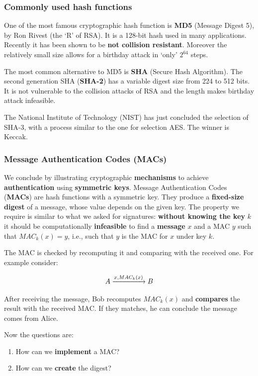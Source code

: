 \subsubsection{Commonly used hash functions}
One of the most famous cryptographic hash function is \textbf{MD5} (Message Digest 5), by Ron Rivest (the ‘R’ of RSA). It is a 128-bit hash used in many applications. Recently it has been shown to be \textbf{not collision resistant}. Moreover the relatively small size allows for a birthday attack in ‘only’ $2^{64}$ steps.

The most common alternative to MD5 is \textbf{SHA} (Secure Hash Algorithm). The second generation SHA (\textbf{SHA-2}) has a variable digest size from 224 to 512 bits. It is not vulnerable to the collision attacks of RSA and the length makes birthday attack infeasible.

The National Institute of Technology (NIST) has just concluded the selection of SHA-3, with a process similar to the one for selection AES. The winner is Keccak.

\subsubsection{Message Authentication Codes (MACs)}
We conclude by illustrating cryptographic \textbf{mechanisms} to achieve \textbf{authentication} using \textbf{symmetric keys}. Message Authentication Codes (\textbf{MACs}) are hash functions with a symmetric key. They produce a \textbf{fixed-size digest} of a message, whose value depends on the given key. The property we require is similar to what we asked for signatures: \textbf{without knowing the key} $k$ it should be computationally \textbf{infeasible} to find a \textbf{message} $x$ and a MAC $y$ such that $\mathit{MAC}_k(x) = y$, i.e., such that $y$ is the MAC for $x$ under key $k$.

The MAC is checked by recomputing it and comparing with the received one. For example consider:

$$A \xrightarrow{\normalsize x,MAC_k(x)} B$$

After receiving the message, Bob recomputes $MAC_k(x)$ and \textbf{compares} the result with the received MAC. If they matches, he can conclude the message comes from Alice.

Now the questions are:

\begin{enumerate}
    \item How can we \textbf{implement} a MAC?
    \item How can we \textbf{create} the digest?
\end{enumerate}

